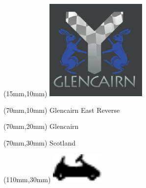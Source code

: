 \null\newpage
\begin{textblock*}{50mm}(15mm,10mm)%
\includegraphics[width=50mm]{LG/GLCN.png}
\end{textblock*}
\begin{textblock*}{130mm}(70mm,10mm)%
{\fontsize{20}{20}\selectfont Glencairn East Reverse}\\
\end{textblock*}
\begin{textblock*}{120mm}(70mm,20mm)%
{\fontsize{16}{16}\selectfont Glencairn}\\
\end{textblock*}
\begin{textblock*}{120mm}(70mm,30mm)%
{\fontsize{12}{12}\selectfont Scotland}
\end{textblock*}
\begin{textblock*}{30mm}(110mm,30mm)%
\centering
\includegraphics[height=15mm]{icons/kart.pdf}
\end{textblock*}

